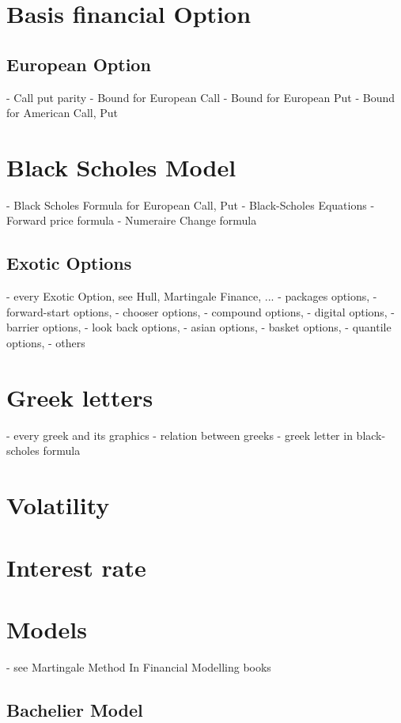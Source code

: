 \documentclass[a4paper,10pt]{article}
\begin{document}
\begin{center}\end{center}
\section{Basis financial Option}
\subsection{European Option}
- Call put parity
- Bound for European Call
- Bound for European Put
- Bound for American Call, Put
\section{Black Scholes Model}
- Black Scholes Formula for European Call, Put
- Black-Scholes Equations
- Forward price formula
- Numeraire Change formula
\subsection{Exotic Options}
- every Exotic Option, see Hull, Martingale Finance, ...
- packages options, 
- forward-start options, 
- chooser options, 
- compound options, 
- digital options, 
- barrier options, 
- look back options, 
- asian options, 
- basket options, 
- quantile options, 
- others
\section{Greek letters}
- every greek and its graphics
- relation between greeks
- greek letter in black-scholes formula
\section{Volatility}
\section{Interest rate}
\section{Models}
- see Martingale Method In Financial Modelling books
\subsection{Bachelier Model}
\end{document}
